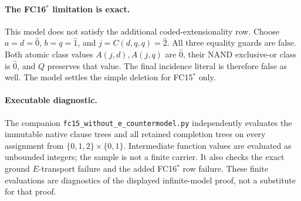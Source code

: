 \paragraph{The FC16$^*$ limitation is exact.}
This model does not satisfy the additional coded-extensionality row.
Choose $a=d=\widehat0$, $b=q=\widehat1$, and
$j=C(d,q,q)=\widehat2$. All three equality guards are false. Both
atomic class values $A(j,d),A(j,q)$ are $\widehat0$, their NAND
exclusive-or class is $\widehat0$, and $Q$ preserves that value.
The final incidence literal is therefore false as well. The model
settles the simple deletion for FC15$^*$ only.

\paragraph{Executable diagnostic.}
The companion \texttt{fc15\_without\_e\_countermodel.py} independently
evaluates the immutable native clause trees and all retained completion
trees on every assignment from
$\{0,1,2\}\times\{0,1\}$. Intermediate function values are evaluated
as unbounded integers; the sample is not a finite carrier. It also
checks the exact ground $E$-transport failure and the added FC16$^*$
row failure. These finite evaluations are diagnostics of the displayed
infinite-model proof, not a substitute for that proof.
